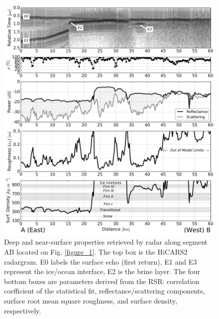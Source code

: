 \documentclass[draft,grl]{agutex}
\begin{document}
\begin{figure}
 \noindent\includegraphics[width=\textwidth]{fig2}
 \caption{Deep and near-surface properties retrieved by radar along segment AB located on Fig. \ref{figure_1}. The top box is the HiCARS2 radargram. E0 labels the surface echo (first return), E1 and E3 represent the ice/ocean interface, E2 is the brine layer. The four bottom boxes are parameters derived from the RSR: correlation coefficient of the statistical fit, reflectance/scattering components, surface root mean square roughness, and surface density, respectively. }
 \label{figure_2}
 \end{figure}
\end{document}
